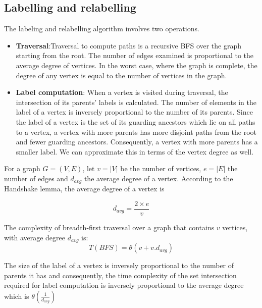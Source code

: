 \subsection{Labelling and relabelling}
The labeling and relabelling algorithm involves two operations.
\begin{itemize}
	\item \textbf{Traversal}:Traversal to compute paths is a recursive BFS over the graph starting from the root. The number of edges examined is proportional to the average degree of vertices. In the worst case, where the graph is complete, the degree of any vertex is equal to the number of vertices in the graph. 
	
	\item \textbf{Label computation}: When a vertex is visited during traversal, the intersection of its parents' labels is calculated. The number of elements in the label of a vertex is inversely proportional to the number of its parents. Since the label of a vertex is the set of its guarding ancestors which lie on all paths to a vertex, a vertex with more parents has more disjoint paths from the root and fewer guarding ancestors. Consequently, a vertex with more parents has a smaller label. We can approximate this in terms of the vertex degree as well. 
\end{itemize}

For a graph $G = (V, E)$, let $v = \lvert V \rvert$ be the number of vertices, $e = \lvert E \rvert$ the number of edges and $d_{avg}$ the average degree of a vertex. According to the Handshake lemma, the average degree of a vertex is 

\begin{equation}
	\mathit{d_{avg}} = \frac{2 \times e}{v} 
\end{equation}


The complexity of breadth-first traversal over a graph that contains $v$ vertices, with average degree $d_{avg}$ is:
\begin{equation*}
	T(\mathit{BFS}) =\theta(v + v.d_{avg}) 
\end{equation*}

The size of the label of a vertex is inversely proportional to the number of parents it has and consequently, the time complexity of the set intersection required for label computation is inversely proportional to the average degree which is $\theta(\frac{1}{d_{avg}})$

